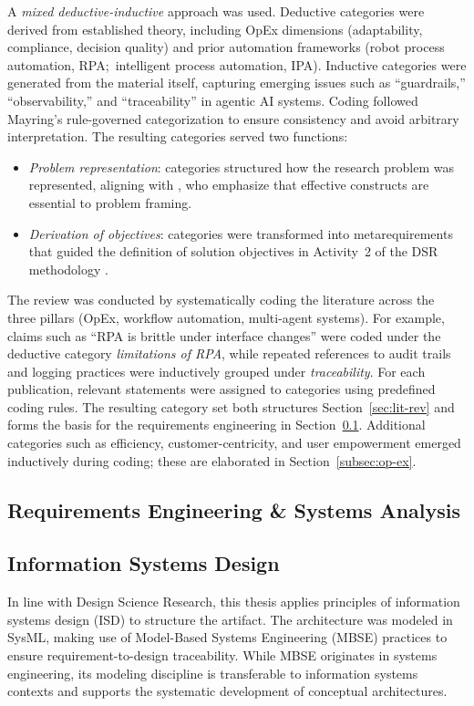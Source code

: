 A \emph{mixed deductive-inductive} approach was used. Deductive categories were derived from established theory, including OpEx dimensions (adaptability, compliance, decision quality) and prior automation frameworks (robot process automation, RPA;~intelligent process automation, IPA). Inductive categories were generated from the material itself, capturing emerging issues such as ``guardrails,'' ``observability,'' and ``traceability'' in agentic AI systems.  Coding followed Mayring's rule-governed categorization to ensure consistency and avoid arbitrary interpretation. The resulting categories served two functions:
\begin{itemize}
    \item \textit{Problem representation}: categories structured how the research problem was represented, aligning with \textcite{hevnerDesign2004}, who emphasize that effective constructs are essential to problem framing.
    \item \textit{Derivation of objectives}: categories were transformed into metarequirements that guided the definition of solution objectives in Activity~2 of the DSR methodology \parencite{peffersDesign2007}.
\end{itemize}

The review was conducted by systematically coding the literature across the three pillars (OpEx, workflow automation, multi-agent systems). 
For example, claims such as ``RPA is brittle under interface changes'' were coded under the deductive category \emph{limitations of RPA}, 
while repeated references to audit trails and logging practices were inductively grouped under \emph{traceability}. 
For each publication, relevant statements were assigned to categories using predefined coding rules. 
The resulting category set both structures Section~\ref{sec:lit-rev} and forms the basis for the requirements engineering in Section~\ref{subsec:re-sa}. Additional categories such as efficiency, customer-centricity, and user empowerment emerged inductively during coding; these are elaborated in Section~\ref{subsec:op-ex}.

\subsection{Requirements Engineering \& Systems Analysis}\label{subsec:re-sa}

\subsection{Information Systems Design}\label{subsec:isd}
In line with Design Science Research, this thesis applies principles of information systems design (ISD) to structure the artifact. The architecture was modeled in SysML, making use of Model-Based Systems Engineering (MBSE) practices to ensure requirement-to-design traceability. While MBSE originates in systems engineering, its modeling discipline is transferable to information systems contexts and supports the systematic development of conceptual architectures.

